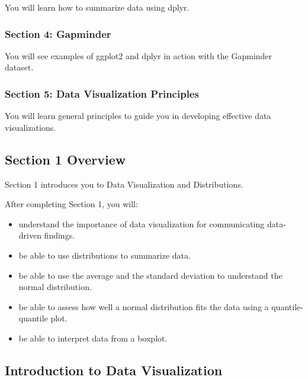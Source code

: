\documentclass[]{article}
\providecommand{\tightlist}{%
  \setlength{\itemsep}{0pt}\setlength{\parskip}{0pt}}
\begin{document}
You will learn how to summarize data using dplyr.

\hypertarget{section-4-gapminder}{%
\subsubsection{Section 4: Gapminder}\label{section-4-gapminder}}

You will see examples of ggplot2 and dplyr in action with the Gapminder
dataset.

\hypertarget{section-5-data-visualization-principles}{%
\subsubsection{Section 5: Data Visualization
Principles}\label{section-5-data-visualization-principles}}

You will learn general principles to guide you in developing effective
data visualizations.

\hypertarget{section-1-overview}{%
\subsection{Section 1 Overview}\label{section-1-overview}}

Section 1 introduces you to Data Visualization and Distributions.

After completing Section 1, you will:

\begin{itemize}
\tightlist
\item
  understand the importance of data visualization for communicating
  data-driven findings.
\item
  be able to use distributions to summarize data.
\item
  be able to use the average and the standard deviation to understand
  the normal distribution.
\item
  be able to assess how well a normal distribution fits the data using a
  quantile-quantile plot.
\item
  be able to interpret data from a boxplot.
\end{itemize}

\hypertarget{introduction-to-data-visualization}{%
\subsection{Introduction to Data
Visualization}\label{introduction-to-data-visualization}}
\end{document}
